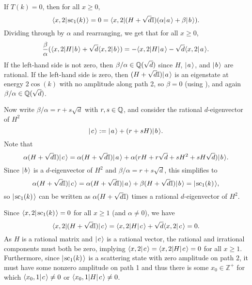 \documentclass[../thesis-main/thesis-main]{subfiles}
\begin{document}
If $T(k) = 0$, then for all $x \geq 0$, 
\begin{equation}
  \langle x,2|\mspace{2mu} \text{sc}_1(k) \mspace{2mu} \rangle 
  = 0 
  = \langle{x,2} |(H + \sqrt{d}\mathbb{I}) (\alpha |\mspace{2mu} a \mspace{2mu} \rangle + \beta |\mspace{2mu} b \mspace{2mu} \rangle).
\end{equation}
Dividing through by $\alpha$ and rearranging, we get that for all $x\geq 0$,
\begin{equation*}
\frac{\beta}{\alpha} (\langle{x,2}| H|\mspace{2mu} b \mspace{2mu} \rangle+\sqrt{d} \langle{x,2}|\mspace{2mu} b \mspace{2mu} \rangle)
  =-\langle{x,2}| H|\mspace{2mu} a \mspace{2mu} \rangle  -\sqrt{d} \langle{x,2}|\mspace{2mu} a \mspace{2mu} \rangle.
\label{eq:cases_eqn}
\end{equation*}
If the left-hand side is not zero, then $\beta/\alpha \in \mathbb{Q}(\sqrt{d})$ since $H$, $|\mspace{2mu} a \mspace{2mu} \rangle$, and $|\mspace{2mu} b \mspace{2mu} \rangle$ are rational.  If the left-hand side is zero, then $(H+ \sqrt{d}\mathbb{I})|\mspace{2mu} a \mspace{2mu} \rangle$ is an eigenstate at energy $2\cos(k)$ with no amplitude along path 2, so $\beta = 0$ (using ), and again $\beta/\alpha \in \mathbb{Q}(\sqrt{d})$.

Now write $\beta/\alpha=r+s\sqrt{d}$ with $r,s\in\mathbb{Q}$, and consider the rational $d$-eigenvector of $H^2$
\begin{equation}
  |\mspace{2mu} c \mspace{2mu} \rangle := |\mspace{2mu} a \mspace{2mu} \rangle + (r+sH) |\mspace{2mu} b \mspace{2mu} \rangle.
\end{equation}
Note that
\begin{equation}
  \alpha (H + \sqrt{d} \mathbb{I}) |\mspace{2mu} c \mspace{2mu} \rangle 
= \alpha(H+ \sqrt{d} \mathbb{I}) |\mspace{2mu} a \mspace{2mu} \rangle + \alpha (rH+r\sqrt{d}+ sH^2+sH\sqrt{d}) |\mspace{2mu} b \mspace{2mu} \rangle.
\end{equation}
Since $|\mspace{2mu} b \mspace{2mu} \rangle$ is a $d$-eigenvector of $H^2$ and $\beta/\alpha=r+s\sqrt{d}$, this simplifies to
\begin{equation}
  \alpha (H + \sqrt{d}\mathbb{I}) |\mspace{2mu} c \mspace{2mu} \rangle 
  = \alpha (H + \sqrt{d}\mathbb{I}) |\mspace{2mu} a \mspace{2mu} \rangle + \beta(H + \sqrt{d}\mathbb{I}) |\mspace{2mu} b \mspace{2mu} \rangle 
  = |\mspace{2mu} \text{sc}_1(k) \mspace{2mu} \rangle, \label{eq:sc1_c}
\end{equation}
so $|\mspace{2mu} \text{sc}_1(k) \mspace{2mu} \rangle$ can be written as $\alpha(H+\sqrt{d}\mathbb{I})$ times a rational $d$-eigenvector of $H^2$.

Since $\langle{x,2}|\mspace{2mu} \text{sc}_1(k) \mspace{2mu} \rangle = 0$ for all $x\geq 1$ (and $\alpha\neq 0$), we have
\begin{equation}
  \langle{x,2}| (H+\sqrt{d}\mathbb{I}) |\mspace{2mu} c \mspace{2mu} \rangle 
  = \langle{x,2}| H |\mspace{2mu} c \mspace{2mu} \rangle + \sqrt{d} \langle{x,2}|\mspace{2mu} c \mspace{2mu} \rangle 
  = 0.
\end{equation}
As $H$ is a rational matrix and $|\mspace{2mu} c \mspace{2mu} \rangle$ is a rational vector, the rational and irrational components must both be zero, implying $\langle{x,2}|\mspace{2mu} c \mspace{2mu} \rangle  =\langle{x,2}|H|\mspace{2mu} c \mspace{2mu} \rangle = 0$ for all $x\geq 1$. Furthermore, since $ |\mspace{2mu} \text{sc}_1(k) \mspace{2mu} \rangle$ is a scattering state with zero amplitude on path $2$, it must have some nonzero amplitude on path 1 and thus there is some $x_0\in \mathbb{Z}^+$ for which $\langle{x_0,1}|\mspace{2mu} c \mspace{2mu} \rangle\neq 0$ or $\langle{x_0,1}|H|\mspace{2mu} c \mspace{2mu} \rangle \neq 0$.
\end{document}

